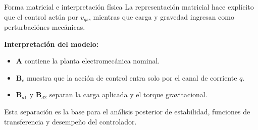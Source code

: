 \documentclass[aspectratio=169,t]{beamer}
\begin{document}
\begin{frame}{Forma matricial e interpretación física}
{\small\color{uncGray}La representación matricial hace explícito que el control actúa por $v_{qs}$, mientras que carga y gravedad ingresan como perturbaciónes mecánicas.}\par
\vspace{2mm}

\centering
{}

\textbf{Interpretación del modelo:}
\begin{itemize}
  \item $\bm{A}$ contiene la planta electromecánica nominal.
  \item $\bm{B}_c$ muestra que la acción de control entra solo por el canal de corriente $q$.
  \item $\bm{B}_{d1}$ y $\bm{B}_{d2}$ separan la carga aplicada y el torque gravitacional.
\end{itemize}

{\small Esta separación es la base para el análisis posterior de estabilidad, funciones de transferencia y desempeño del controlador.}
\end{frame}
\end{document}
